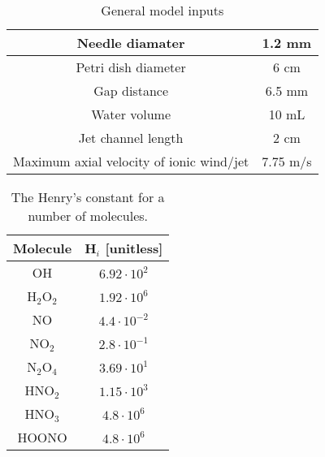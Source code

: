 \begin{table}[htpb]
    \begin{center}
        \begin{tabular}{|c |c |}
        \hline
        Needle diamater & 1.2 mm \\
        \hline
        Petri dish diameter & 6 cm \\
        \hline
        Gap distance & 6.5 mm \\
        \hline
        Water volume & 10 mL \\
        \hline
        Jet channel length & 2 cm \\
        \hline
        Maximum axial velocity of ionic wind/jet & 7.75 m/s \\
        \hline
        \end{tabular}
    \end{center}
    \caption{General model inputs}
    \label{tab:gen_inputs}
\end{table}

    \begin{table}[htpb] %
        \begin{center}
            \begin{tabular}{c |c }\rmfamily
                Molecule & H$_i$ [unitless] \\ \hline \hline
                OH & $6.92\cdot10^2$\\
                H$_2$O$_2$ & $1.92\cdot10^6$\\
                NO & $4.4\cdot10^{-2}$\\
                NO$_2$ & $2.8\cdot10^{-1}$\\
                N$_2$O$_4$ & $3.69\cdot10^1$\\
                HNO$_2$ & $1.15\cdot10^3$\\
                HNO$_3$ & $4.8\cdot10^6$\\
                HOONO & $4.8\cdot10^6$\\
            \end{tabular}
    \end{center}
        \caption{The Henry's constant for a number of molecules\cite{Tian2014}.}
        \label{tab:henryconstants}
    \end{table}


